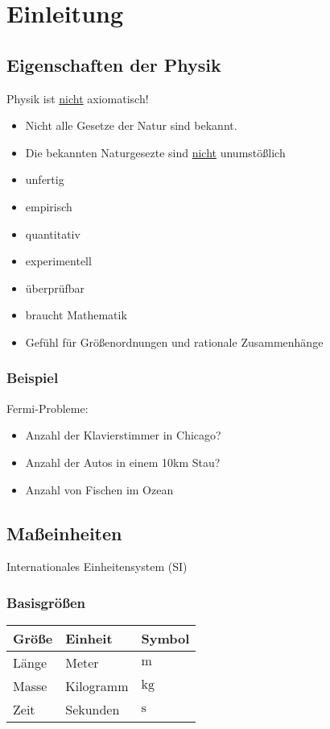\documentclass[a4paper]{scrartcl}
\theoremstyle{definition}
\theoremstyle{plain}
\theoremstyle{plain}
\theoremstyle{remark}
\theoremstyle{remark}
\theoremstyle{remark}
\begin{document}
\section{Einleitung}
\label{sec-1}
\subsection{Eigenschaften der Physik}
\label{sec-1-1}
Physik ist \uline{nicht} axiomatisch!
\begin{itemize}
\item Nicht alle Gesetze der Natur sind bekannt.
\item Die bekannten Naturgesezte sind \uline{nicht} unumstößlich
\item unfertig
\item empirisch
\item quantitativ
\item experimentell
\item überprüfbar
\item braucht Mathematik
\item Gefühl für Größenordnungen und rationale Zusammenhänge
\end{itemize}
\subsubsection{Beispiel}
\label{sec-1-1-1}
Fermi-Probleme:
\begin{itemize}
\item Anzahl der Klavierstimmer in Chicago?
\item Anzahl der Autos in einem 10km Stau?
\item Anzahl von Fischen im Ozean
\end{itemize}

\subsection{Maßeinheiten}
\label{sec-1-2}
Internationales Einheitensystem (SI)
\subsubsection{Basisgrößen}
\label{sec-1-2-1}
\begin{center}
\begin{tabular}{lll}
Größe & Einheit & Symbol\\
\hline
Länge & Meter & $\si{\meter}$\\
Masse & Kilogramm & $\si{\kg}$\\
Zeit & Sekunden & $\si{\second}$\\
\end{tabular}
\end{center}
\end{document}
